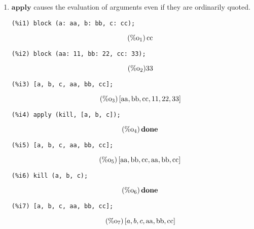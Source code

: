 \documentclass[12pt,leqno]{article}
\begin{document}
\begin{enumerate}
\item $\mathbf{apply}$ causes the evaluation of arguments even if they are ordinarily quoted.
\begin{verbatim}
(%i1) block (a: aa, b: bb, c: cc);
\end{verbatim}
\begin{equation}
\tag{$\mathop{\mathrm{\%o}}_{1}$}\mathop{\mathrm{cc}}
\label{eq:doc-group1-code19-1-1}
\end{equation}
\begin{verbatim}
(%i2) block (aa: 11, bb: 22, cc: 33);
\end{verbatim}
\begin{equation}
\tag{$\mathop{\mathrm{\%o}}_{2}$}33
\label{eq:doc-group1-code19-2-1}
\end{equation}
\begin{verbatim}
(%i3) [a, b, c, aa, bb, cc];
\end{verbatim}
\begin{equation}
\tag{$\mathop{\mathrm{\%o}}_{3}$}\left[\mathop{\mathrm{aa}}, \mathop{\mathrm{bb}}, \mathop{\mathrm{cc}}, 11, 22, 33\right]
\label{eq:doc-group1-code19-3-1}
\end{equation}
\begin{verbatim}
(%i4) apply (kill, [a, b, c]);
\end{verbatim}
\begin{equation}
\tag{$\mathop{\mathrm{\%o}}_{4}$}\mathop\mathbf{done}
\label{eq:doc-group1-code19-4-1}
\end{equation}
\begin{verbatim}
(%i5) [a, b, c, aa, bb, cc];
\end{verbatim}
\begin{equation}
\tag{$\mathop{\mathrm{\%o}}_{5}$}\left[\mathop{\mathrm{aa}}, \mathop{\mathrm{bb}}, \mathop{\mathrm{cc}}, \mathop{\mathrm{aa}}, \mathop{\mathrm{bb}}, \mathop{\mathrm{cc}}\right]
\label{eq:doc-group1-code19-5-1}
\end{equation}
\begin{verbatim}
(%i6) kill (a, b, c);
\end{verbatim}
\begin{equation}
\tag{$\mathop{\mathrm{\%o}}_{6}$}\mathop\mathbf{done}
\label{eq:doc-group1-code19-6-1}
\end{equation}
\begin{verbatim}
(%i7) [a, b, c, aa, bb, cc];
\end{verbatim}
\begin{equation}
\tag{$\mathop{\mathrm{\%o}}_{7}$}\left[a, b, c, \mathop{\mathrm{aa}}, \mathop{\mathrm{bb}}, \mathop{\mathrm{cc}}\right]
\label{eq:doc-group1-code19-7-1}
\end{equation}



\end{enumerate}
\end{document}
